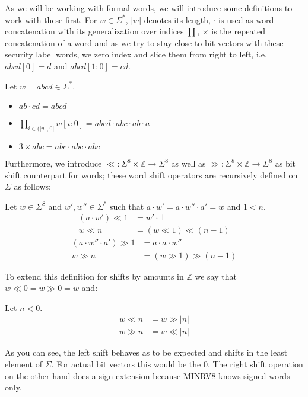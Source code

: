 As we will be working with formal words, we will introduce some definitions to work with these first.
For $ w  \in \Sigma^* $, $ |w| $ denotes its length,
$ \cdot $ is used as word concatenation with its generalization over indices $ \prod $, $ \times $ is the repeated concatenation of a word and as we try to stay close to bit vectors with these security label words, we zero index and slice them from right to left, i.e. $ abcd[0] = d $ and $ abcd[1:0] = cd $.

\begin{example}
    Let $ w = abcd \in \Sigma^* $.
    \begin{itemize}
        \item $ ab \cdot cd = abcd $
        \item $ \prod_{i \in (|w|, 0]} w[i:0] = abcd \cdot abc \cdot ab \cdot a $
        \item $ 3 \times abc = abc \cdot abc \cdot abc $
    \end{itemize}
\end{example}

Furthermore, we introduce $ \ll : \Sigma^8 \times \mathbb{Z} \rightarrow \Sigma^8 $ as well as $ \gg : \Sigma^8 \times \mathbb{Z} \rightarrow \Sigma^8 $ as bit shift counterpart for words; these word shift operators are recursively defined on $ \Sigma $ as follows:

Let $ w \in \Sigma^8 $ and $ w', w'' \in \Sigma^* $ such that $ a \cdot w' = a \cdot w'' \cdot a' = w $ and $ 1 < n $.
\begin{align*}
    (a \cdot w') \ll 1 &= w' \cdot \bot \\
    w \ll n &= (w \ll 1) \ll (n - 1)
\end{align*}
\begin{align*}
    (a \cdot w'' \cdot a') \gg 1 &= a \cdot a \cdot w'' \\
    w \gg n &= (w \gg 1) \gg (n - 1)
\end{align*}

To extend this definition for shifts by amounts in $ \mathbb{Z} $ we say that $ w \ll 0 = w \gg 0 = w $ and:

Let $ n < 0 $.
\begin{align*}
    w \ll n &= w \gg |n| \\
    w \gg n &= w \ll |n|
\end{align*}

As you can see, the left shift behaves as to be expected and shifts in the least element of $ \Sigma $.
For actual bit vectors this would be the 0.
The right shift operation on the other hand does a sign extension because MINRV8 knows signed words only.

